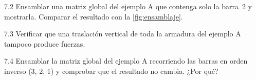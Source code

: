 \begin{ejercicio}{7.2}
Ensamblar una matriz global del ejemplo A que contenga solo la barra~2 y
mostrarla. Comparar el resultado con la \cref{fig:ensamblaje}.
\end{ejercicio}

\begin{ejercicio}{7.3}
Verificar que una traslación vertical de toda la armadura del ejemplo A
tampoco produce fuerzas.
\end{ejercicio}

\begin{ejercicio}{7.4}
Ensamblar la matriz global del ejemplo A recorriendo las barras en orden
inverso (3, 2, 1) y comprobar que el resultado no cambia. ¿Por qué?
\end{ejercicio}

